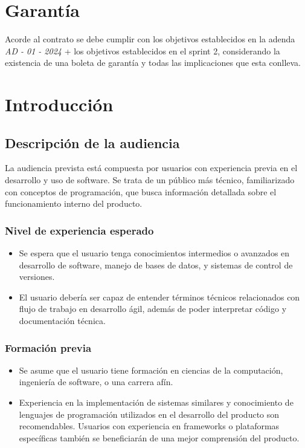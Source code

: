 \documentclass[12pt,letterpaper]{article}
\begin{document}
\tableofcontents
\listoffigures
\listoftables
\newpage


\section{Garantía}

Acorde al contrato se debe cumplir con los objetivos establecidos en la adenda \textit{AD - 01 - 2024} + los objetivos establecidos en el sprint 2, considerando la existencia de una boleta de garantía y todas las implicaciones que esta conlleva.

\section{Introducción}

    \subsection{Descripción de la audiencia}
    
    La audiencia prevista está compuesta por usuarios con experiencia previa en el desarrollo y uso de software. Se trata de un público más técnico, familiarizado con conceptos de programación, que busca información detallada sobre el funcionamiento interno del producto.

    \subsubsection{Nivel de experiencia esperado}
    \begin{itemize}
        \item Se espera que el usuario tenga conocimientos intermedios o avanzados en desarrollo de software, manejo de bases de datos, y sistemas de control de versiones.
        \item El usuario debería ser capaz de entender términos técnicos relacionados con flujo de trabajo en desarrollo ágil, además de poder interpretar código y documentación técnica.
    \end{itemize}
    
    \subsubsection{Formación previa}
    \begin{itemize}
        \item Se asume que el usuario tiene formación en ciencias de la computación, ingeniería de software, o una carrera afín.
        \item Experiencia en la implementación de sistemas similares y conocimiento de lenguajes de programación utilizados en el desarrollo del producto son recomendables. Usuarios con experiencia en frameworks o plataformas específicas también se beneficiarán de una mejor comprensión del producto.
    \end{itemize}
    
\end{document}
